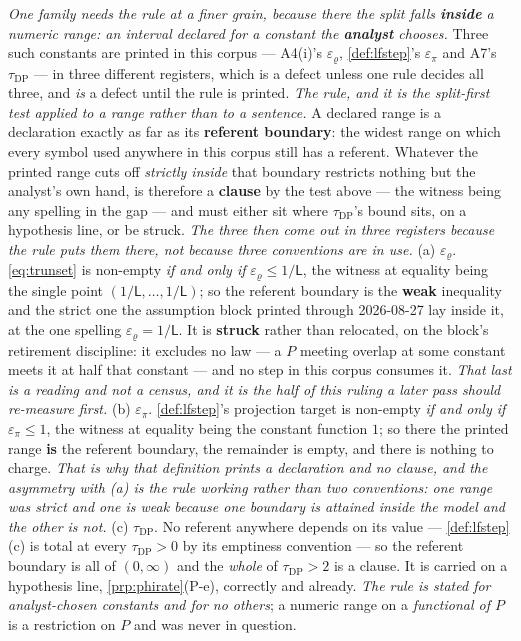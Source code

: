 \emph{One family needs the rule at a finer grain, because there the split falls \textbf{inside} a
numeric range: an interval declared for a constant the \textbf{analyst} chooses.} Three such constants
are printed in this corpus --- A4(i)'s $\varepsilon_\varrho$, \cref{def:lfstep}'s $\varepsilon_\pi$ and
A7's $\tau_{\mathrm{DP}}$ --- in three different registers, which is a defect unless one rule decides all
three, and \emph{is} a defect until the rule is printed. \emph{The rule, and it is the split-first test
applied to a range rather than to a sentence.} A declared range is a declaration exactly as far as its
\textbf{referent boundary}: the widest range on which every symbol used anywhere in this corpus still has
a referent. Whatever the printed range cuts off \emph{strictly inside} that boundary restricts nothing
but the analyst's own hand, is therefore a \textbf{clause} by the test above --- the witness being any
spelling in the gap --- and must either sit where $\tau_{\mathrm{DP}}$'s bound sits, on a hypothesis
line, or be struck. \emph{The three then come out in three registers because the rule puts them there,
not because three conventions are in use.}
\textup{(a)} $\varepsilon_\varrho$. \eqref{eq:trunset} is non-empty \emph{if and only if}
$\varepsilon_\varrho\le1/\mathsf L$, the witness at equality being the single point
$(1/\mathsf L,\dots,1/\mathsf L)$; so the referent boundary is the \textbf{weak} inequality and the strict
one the assumption block printed through 2026-08-27 lay inside it, at the one spelling
$\varepsilon_\varrho=1/\mathsf L$. It is \textbf{struck} rather than relocated, on the block's
retirement discipline: it excludes no law --- a $P$ meeting overlap at some constant meets it at half
that constant --- and no step in this corpus consumes it. \emph{That last is a reading and not a census,
and it is the half of this ruling a later pass should re-measure first.}
\textup{(b)} $\varepsilon_\pi$. \cref{def:lfstep}'s projection target is non-empty \emph{if and only if}
$\varepsilon_\pi\le1$, the witness at equality being the constant function $1$; so there the printed
range \textbf{is} the referent boundary, the remainder is empty, and there is nothing to charge.
\emph{That is why that definition prints a declaration and no clause, and the asymmetry with
\textup{(a)} is the rule working rather than two conventions: one range was strict and one is weak
because one boundary is attained inside the model and the other is not.}
\textup{(c)} $\tau_{\mathrm{DP}}$. No referent anywhere depends on its value ---
\cref{def:lfstep}\textup{(c)} is total at every $\tau_{\mathrm{DP}}>0$ by its emptiness convention ---
so the referent boundary is all of $(0,\infty)$ and the \emph{whole} of $\tau_{\mathrm{DP}}>2$ is a
clause. It is carried on a hypothesis line, \cref{prp:phirate}\textup{(P-e)}, correctly and already.
\emph{The rule is stated for analyst-chosen constants and for no others}; a numeric range on a
\emph{functional of $P$} is a restriction on $P$ and was never in question.

